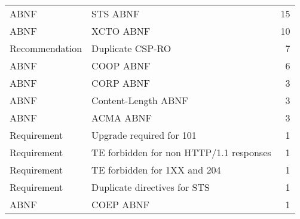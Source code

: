 \begin{tabular}{llr}
               ABNF &                                    STS ABNF &       15 \\
               ABNF &                                   XCTO ABNF &       10 \\
     Recommendation &                            Duplicate CSP-RO &        7 \\
               ABNF &                                   COOP ABNF &        6 \\
               ABNF &                                   CORP ABNF &        3 \\
               ABNF &                         Content-Length ABNF &        3 \\
               ABNF &                                   ACMA ABNF &        3 \\
        Requirement &                    Upgrade required for 101 &        1 \\
        Requirement &     TE forbidden for non HTTP/1.1 responses &        1 \\
        Requirement &                TE forbidden for 1XX and 204 &        1 \\
        Requirement &                Duplicate directives for STS &        1 \\
               ABNF &                                   COEP ABNF &        1 \\
\bottomrule
\end{tabular}
